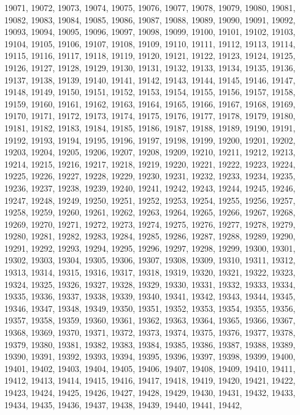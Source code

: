19071,
19072,
19073,
19074,
19075,
19076,
19077,
19078,
19079,
19080,
19081,
19082,
19083,
19084,
19085,
19086,
19087,
19088,
19089,
19090,
19091,
19092,
19093,
19094,
19095,
19096,
19097,
19098,
19099,
19100,
19101,
19102,
19103,
19104,
19105,
19106,
19107,
19108,
19109,
19110,
19111,
19112,
19113,
19114,
19115,
19116,
19117,
19118,
19119,
19120,
19121,
19122,
19123,
19124,
19125,
19126,
19127,
19128,
19129,
19130,
19131,
19132,
19133,
19134,
19135,
19136,
19137,
19138,
19139,
19140,
19141,
19142,
19143,
19144,
19145,
19146,
19147,
19148,
19149,
19150,
19151,
19152,
19153,
19154,
19155,
19156,
19157,
19158,
19159,
19160,
19161,
19162,
19163,
19164,
19165,
19166,
19167,
19168,
19169,
19170,
19171,
19172,
19173,
19174,
19175,
19176,
19177,
19178,
19179,
19180,
19181,
19182,
19183,
19184,
19185,
19186,
19187,
19188,
19189,
19190,
19191,
19192,
19193,
19194,
19195,
19196,
19197,
19198,
19199,
19200,
19201,
19202,
19203,
19204,
19205,
19206,
19207,
19208,
19209,
19210,
19211,
19212,
19213,
19214,
19215,
19216,
19217,
19218,
19219,
19220,
19221,
19222,
19223,
19224,
19225,
19226,
19227,
19228,
19229,
19230,
19231,
19232,
19233,
19234,
19235,
19236,
19237,
19238,
19239,
19240,
19241,
19242,
19243,
19244,
19245,
19246,
19247,
19248,
19249,
19250,
19251,
19252,
19253,
19254,
19255,
19256,
19257,
19258,
19259,
19260,
19261,
19262,
19263,
19264,
19265,
19266,
19267,
19268,
19269,
19270,
19271,
19272,
19273,
19274,
19275,
19276,
19277,
19278,
19279,
19280,
19281,
19282,
19283,
19284,
19285,
19286,
19287,
19288,
19289,
19290,
19291,
19292,
19293,
19294,
19295,
19296,
19297,
19298,
19299,
19300,
19301,
19302,
19303,
19304,
19305,
19306,
19307,
19308,
19309,
19310,
19311,
19312,
19313,
19314,
19315,
19316,
19317,
19318,
19319,
19320,
19321,
19322,
19323,
19324,
19325,
19326,
19327,
19328,
19329,
19330,
19331,
19332,
19333,
19334,
19335,
19336,
19337,
19338,
19339,
19340,
19341,
19342,
19343,
19344,
19345,
19346,
19347,
19348,
19349,
19350,
19351,
19352,
19353,
19354,
19355,
19356,
19357,
19358,
19359,
19360,
19361,
19362,
19363,
19364,
19365,
19366,
19367,
19368,
19369,
19370,
19371,
19372,
19373,
19374,
19375,
19376,
19377,
19378,
19379,
19380,
19381,
19382,
19383,
19384,
19385,
19386,
19387,
19388,
19389,
19390,
19391,
19392,
19393,
19394,
19395,
19396,
19397,
19398,
19399,
19400,
19401,
19402,
19403,
19404,
19405,
19406,
19407,
19408,
19409,
19410,
19411,
19412,
19413,
19414,
19415,
19416,
19417,
19418,
19419,
19420,
19421,
19422,
19423,
19424,
19425,
19426,
19427,
19428,
19429,
19430,
19431,
19432,
19433,
19434,
19435,
19436,
19437,
19438,
19439,
19440,
19441,
19442,
